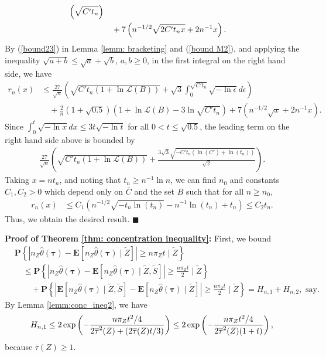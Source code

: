\documentclass[12pt, fullpage]{amsart}
\theoremstyle{definition}
\theoremstyle{definition}
\theoremstyle{definition}
\begin{document}
\begin{bibunit}[econometrica]
\begin{align}
	\left(\sqrt{C' t_n}\right)\\ \notag
	&\quad + 7 \left( n^{-1/2} \sqrt{2 C' t_n x} + 2 n^{-1} x\right).
\end{align}
By (\ref{bound23}) in Lemma \ref{lemm: bracketing} and (\ref{bound M2}), and applying the inequality $\sqrt{a+b} \le \sqrt{a} + \sqrt{b}$, $a,b \ge 0$, in the first integral on the right hand side, we have 
\begin{align*}
    r_n(x) &\le \frac{27}{\sqrt{n}} \left( \sqrt{ C' t_n (1 + \ln \mathcal{L}(B))}  + \sqrt{3}\int_0^{\sqrt{C' t_n}} \sqrt{-\ln \epsilon } d\epsilon \right) \\
	&\quad + \frac{2}{n}\left(1 + \sqrt{0.5}\right) \left(1 + \ln \mathcal{L}(B) - 3 \ln \sqrt{C' t_n} \right) + 7 \left( n^{-1/2} \sqrt{x} + 2 n^{-1} x\right).
\end{align*}
Since $\int_0^t \sqrt{-\ln x} dx \le 3t \sqrt{-\ln t}$ for all $0 < t \le \sqrt{0.5}$,  the leading term on the right hand side above is bounded by 
\begin{align*}
    \frac{27}{\sqrt{n}} \left( \sqrt{ C' t_n (1 + \ln \mathcal{L}(B))}  + \frac{3 \sqrt{3} \sqrt{-C' t_n (\ln(C') + \ln(t_n))}}{\sqrt{2}} \right).
\end{align*}
Taking $x = n t_n$, and noting that $t_n \ge n^{-1} \ln n$, we can find $n_0$ and constants $C_1,C_2>0$ which depend only on $\overline C$ and the set $B$ such that for all $n \ge n_0$,
\begin{align*}
	r_n(x) &\le C_1\left(n^{-1/2} \sqrt{-t_n \ln(t_n)} - n^{-1} \ln(t_n) + t_n\right) \le C_2 t_n.
\end{align*}
Thus, we obtain the desired result. $\blacksquare$\medskip

\noindent \textbf{Proof of Theorem \ref{thm: concentration inequality}: } First, we bound 
\begin{align*}
	&\mathbf{P}\left\{ \left| n_Z \hat \theta(\boldsymbol{\tau}) - \mathbf{E}\left[ n_Z \hat \theta(\boldsymbol{\tau}) \mid \tilde Z \right] \right|  \ge  n \pi_Z t \mid \tilde Z \right\} \\
    &\quad \le \mathbf{P}\left\{ \left| n_Z \hat \theta(\boldsymbol{\tau}) - \mathbf{E}\left[ n_Z \hat \theta(\boldsymbol{\tau}) \mid \tilde Z, \tilde S \right] \right|  \ge \frac{n \pi_Z t}{2} \mid \tilde Z \right\} \\
	&\quad \quad + \mathbf{P}\left\{ \left| \mathbf{E}\left[ n_Z \hat \theta(\boldsymbol{\tau}) \mid \tilde Z, \tilde S \right] - \mathbf{E}\left[ n_Z \hat \theta(\boldsymbol{\tau}) \mid \tilde Z \right] \right|  \ge \frac{n \pi_Z t}{2} \mid \tilde Z \right\} = H_{n,1} + H_{n,2}, \text{ say}.
\end{align*}
By Lemma \ref{lemm:conc_ineq2}, we have 
\begin{align}
	\label{H_{n,1}}
	H_{n,1} \le 2 \exp\left(-\frac{ n \pi_Z t^2/4}{\displaystyle 2 \overline \tau^2(Z) + \left(2 \overline \tau(Z) t/3 \right)}\right)
    \le 2 \exp\left(-\frac{ n \pi_Z t^2/4}{\displaystyle 2 \overline \tau^2(Z) (1 + t)}\right),
\end{align}
because $\overline \tau(Z) \ge 1$.


\end{bibunit}
\end{document}
